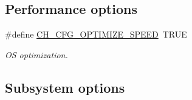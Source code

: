 \subsection*{Performance options}
\begin{DoxyCompactItemize}
\item 
\#define \hyperlink{group__config_gac7a7942b6c4ef2f79416971688a49c40}{C\+H\+\_\+\+C\+F\+G\+\_\+\+O\+P\+T\+I\+M\+I\+Z\+E\+\_\+\+S\+P\+E\+ED}~T\+R\+UE
\begin{DoxyCompactList}\small\item\em OS optimization. \end{DoxyCompactList}\end{DoxyCompactItemize}
\subsection*{Subsystem options}
